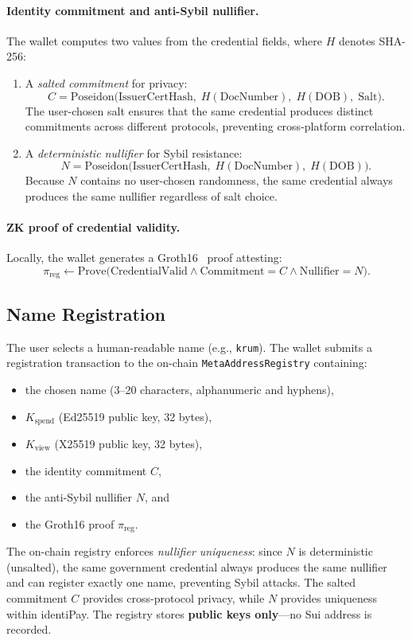 \documentclass[11pt]{article}
\begin{document}
\paragraph{Identity commitment and anti-Sybil nullifier.}
The wallet computes two values from the credential fields, where $H$ denotes SHA-256:
\begin{enumerate}
  \item A \emph{salted commitment} for privacy:
  $$
  C = \mathrm{Poseidon}\big(\mathrm{IssuerCertHash},\; H(\mathrm{DocNumber}),\; H(\mathrm{DOB}),\; \mathrm{Salt}\big).
  $$
  The user-chosen salt ensures that the same credential produces distinct commitments across different protocols, preventing cross-platform correlation.

  \item A \emph{deterministic nullifier} for Sybil resistance:
  $$
  N = \mathrm{Poseidon}\big(\mathrm{IssuerCertHash},\; H(\mathrm{DocNumber}),\; H(\mathrm{DOB})\big).
  $$
  Because $N$ contains no user-chosen randomness, the same credential always produces the same nullifier regardless of salt choice.
\end{enumerate}

\paragraph{ZK proof of credential validity.}
Locally, the wallet generates a Groth16~\cite{groth16} proof attesting:
$$
\pi_{\mathrm{reg}} \leftarrow \mathrm{Prove}\big(\mathrm{CredentialValid} \land \mathrm{Commitment} = C \land \mathrm{Nullifier} = N\big).
$$

\subsection{Name Registration}
The user selects a human-readable name (e.g., \texttt{krum}). The wallet submits a registration transaction to the on-chain \texttt{MetaAddressRegistry} containing:
\begin{itemize}
  \item the chosen name (3--20 characters, alphanumeric and hyphens),
  \item $K_{\mathrm{spend}}$ (Ed25519 public key, 32 bytes),
  \item $K_{\mathrm{view}}$ (X25519 public key, 32 bytes),
  \item the identity commitment $C$,
  \item the anti-Sybil nullifier $N$, and
  \item the Groth16 proof $\pi_{\mathrm{reg}}$.
\end{itemize}
The on-chain registry enforces \emph{nullifier uniqueness}: since $N$ is deterministic (unsalted), the same government credential always produces the same nullifier and can register exactly one name, preventing Sybil attacks. The salted commitment $C$ provides cross-protocol privacy, while $N$ provides uniqueness within identiPay. The registry stores \textbf{public keys only}---no Sui address is recorded.
\end{document}
